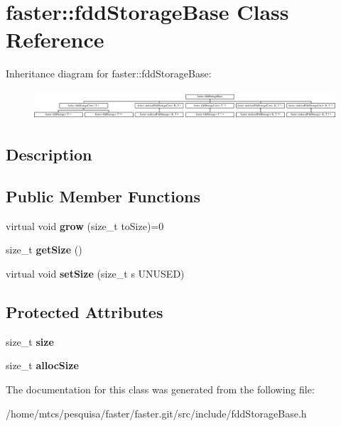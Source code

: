 \hypertarget{classfaster_1_1fddStorageBase}{}\section{faster\+:\+:fdd\+Storage\+Base Class Reference}
\label{classfaster_1_1fddStorageBase}
Inheritance diagram for faster\+:\+:fdd\+Storage\+Base\+:\begin{figure}[H]
\begin{center}
\leavevmode
\includegraphics[height=1.093750cm]{classfaster_1_1fddStorageBase}
\end{center}
\end{figure}


\subsection{Description}
\subsection*{Public Member Functions}
\begin{DoxyCompactItemize}
\item 
\hypertarget{classfaster_1_1fddStorageBase_a8052833a8e5c933d14370c0c3ed6bdeb}{}\label{classfaster_1_1fddStorageBase_a8052833a8e5c933d14370c0c3ed6bdeb} 
virtual void {\bfseries grow} (size\+\_\+t to\+Size)=0
\item 
\hypertarget{classfaster_1_1fddStorageBase_adfcf6d4431323da59cebc65702dbb079}{}\label{classfaster_1_1fddStorageBase_adfcf6d4431323da59cebc65702dbb079} 
size\+\_\+t {\bfseries get\+Size} ()
\item 
\hypertarget{classfaster_1_1fddStorageBase_aa71da7a3babbd344210d1fcbb7b5e3dc}{}\label{classfaster_1_1fddStorageBase_aa71da7a3babbd344210d1fcbb7b5e3dc} 
virtual void {\bfseries set\+Size} (size\+\_\+t s U\+N\+U\+S\+ED)
\end{DoxyCompactItemize}
\subsection*{Protected Attributes}
\begin{DoxyCompactItemize}
\item 
\hypertarget{classfaster_1_1fddStorageBase_a02c7538275a50f7dd83330acc631a603}{}\label{classfaster_1_1fddStorageBase_a02c7538275a50f7dd83330acc631a603} 
size\+\_\+t {\bfseries size}
\item 
\hypertarget{classfaster_1_1fddStorageBase_a474fed6198e4bc7c41cdb2d464bb77ec}{}\label{classfaster_1_1fddStorageBase_a474fed6198e4bc7c41cdb2d464bb77ec} 
size\+\_\+t {\bfseries alloc\+Size}
\end{DoxyCompactItemize}


The documentation for this class was generated from the following file\+:\begin{DoxyCompactItemize}
\item 
/home/mtcs/pesquisa/faster/faster.\+git/src/include/fdd\+Storage\+Base.\+h\end{DoxyCompactItemize}
